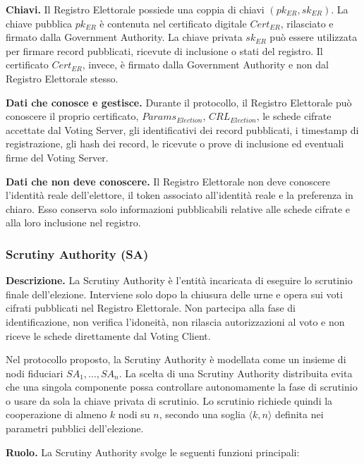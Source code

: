 \documentclass[a4paper,12pt]{article}
\begin{document}
\textbf{Chiavi.}
Il Registro Elettorale possiede una coppia di chiavi \((pk_{ER}, sk_{ER})\).
La chiave pubblica \(pk_{ER}\) \`e contenuta nel certificato digitale \(Cert_{ER}\), rilasciato e firmato dalla Government Authority.
La chiave privata \(sk_{ER}\) pu\`o essere utilizzata per firmare record pubblicati, ricevute di inclusione o stati del registro.
Il certificato \(Cert_{ER}\), invece, \`e firmato dalla Government Authority e non dal Registro Elettorale stesso.

\textbf{Dati che conosce e gestisce.}
Durante il protocollo, il Registro Elettorale pu\`o conoscere il proprio certificato, \(Params_{Election}\), \(CRL_{Election}\), le schede cifrate accettate dal Voting Server, gli identificativi dei record pubblicati, i timestamp di registrazione, gli hash dei record, le ricevute o prove di inclusione ed eventuali firme del Voting Server.

\textbf{Dati che non deve conoscere.}
Il Registro Elettorale non deve conoscere l'identit\`a reale dell'elettore, il token associato all'identit\`a reale e la preferenza in chiaro.
Esso conserva solo informazioni pubblicabili relative alle schede cifrate e alla loro inclusione nel registro.


\subsubsection{Scrutiny Authority (SA)}

\textbf{Descrizione.}
La Scrutiny Authority \`e l'entit\`a incaricata di eseguire lo scrutinio finale dell'elezione.
Interviene solo dopo la chiusura delle urne e opera sui voti cifrati pubblicati nel Registro Elettorale.
Non partecipa alla fase di identificazione, non verifica l'idoneit\`a, non rilascia autorizzazioni al voto e non riceve le schede direttamente dal Voting Client.

Nel protocollo proposto, la Scrutiny Authority \`e modellata come un insieme di nodi fiduciari \(SA_1,\ldots,SA_n\).
La scelta di una Scrutiny Authority distribuita evita che una singola componente possa controllare autonomamente la fase di scrutinio o usare da sola la chiave privata di scrutinio.
Lo scrutinio richiede quindi la cooperazione di almeno \(k\) nodi su \(n\), secondo una soglia \(\langle k,n\rangle\) definita nei parametri pubblici dell'elezione.

\textbf{Ruolo.}
La Scrutiny Authority svolge le seguenti funzioni principali:
\end{document}
